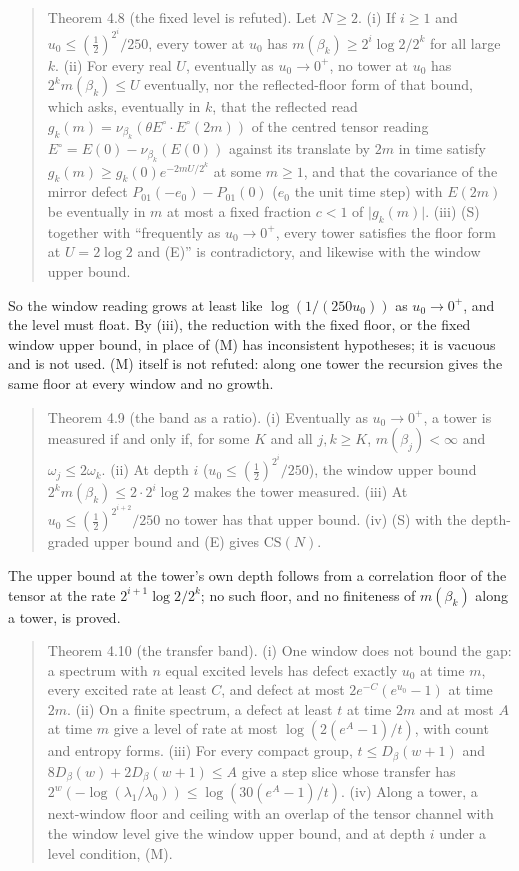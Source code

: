 \documentclass[10pt,letterpaper,twocolumn]{article}
\begin{document}
\begin{quote}
Theorem 4.8 (the fixed level is refuted). Let \(N\ge2\). (i) If \(i\ge1\) and \(u_0\le(\tfrac12)^{2^i}/250\), every tower at \(u_0\) has \(m(\beta_k)\ge2^i\log2/2^k\) for all large \(k\). (ii) For every real \(U\), eventually as \(u_0\to0^+\), no tower at \(u_0\) has \(2^km(\beta_k)\le U\) eventually, nor the reflected-floor form of that bound, which asks, eventually in \(k\), that the reflected read \(g_k(m)=\nu_{\beta_k}(\theta E^\circ\cdot E^\circ(2m))\) of the centred tensor reading \(E^\circ=E(0)-\nu_{\beta_k}(E(0))\) against its translate by \(2m\) in time satisfy \(g_k(m)\ge g_k(0)e^{-2mU/2^k}\) at some \(m\ge1\), and that the covariance of the mirror defect \(P_{01}(-e_0)-P_{01}(0)\) (\(e_0\) the unit time step) with \(E(2m)\) be eventually in \(m\) at most a fixed fraction \(c<1\) of \(\lvert g_k(m)\rvert\). (iii) (S) together with ``frequently as \(u_0\to0^+\), every tower satisfies the floor form at \(U=2\log2\) and (E)'' is contradictory, and likewise with the window upper bound.
\end{quote}

So the window reading grows at least like \(\log(1/(250u_0))\) as \(u_0\to0^+\), and the level must float. By (iii), the reduction with the fixed floor, or the fixed window upper bound, in place of (M) has inconsistent hypotheses; it is vacuous and is not used. (M) itself is not refuted: along one tower the recursion gives the same floor at every window and no growth.

\begin{quote}
Theorem 4.9 (the band as a ratio). (i) Eventually as \(u_0\to0^+\), a tower is measured if and only if, for some \(K\) and all \(j,k\ge K\), \(m(\beta_j)<\infty\) and \(\omega_j\le2\omega_k\). (ii) At depth \(i\) (\(u_0\le(\tfrac12)^{2^i}/250\)), the window upper bound \(2^km(\beta_k)\le2\cdot2^i\log2\) makes the tower measured. (iii) At \(u_0\le(\tfrac12)^{2^{i+2}}/250\) no tower has that upper bound. (iv) (S) with the depth-graded upper bound and (E) gives \(\mathrm{CS}(N)\).
\end{quote}

The upper bound at the tower's own depth follows from a correlation floor of the tensor at the rate \(2^{i+1}\log2/2^k\); no such floor, and no finiteness of \(m(\beta_k)\) along a tower, is proved.

\begin{quote}
Theorem 4.10 (the transfer band). (i) One window does not bound the gap: a spectrum with \(n\) equal excited levels has defect exactly \(u_0\) at time \(m\), every excited rate at least \(C\), and defect at most \(2e^{-C}(e^{u_0}-1)\) at time \(2m\). (ii) On a finite spectrum, a defect at least \(t\) at time \(2m\) and at most \(A\) at time \(m\) give a level of rate at most \(\log(2(e^A-1)/t)\), with count and entropy forms. (iii) For every compact group, \(t\le D_\beta(w+1)\) and \(8D_\beta(w)+2D_\beta(w+1)\le A\) give a step slice whose transfer has \(2^w(-\log(\lambda_1/\lambda_0))\le\log(30(e^A-1)/t)\). (iv) Along a tower, a next-window floor and ceiling with an overlap of the tensor channel with the window level give the window upper bound, and at depth \(i\) under a level condition, (M).
\end{quote}
\end{document}
